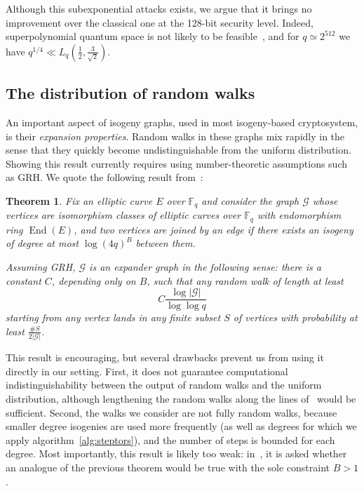 \documentclass{article}
\newcommand{\F}{\mathbb{F}}
\newcommand{\Graph}{\mathcal{G}}
\newtheorem{theorem}{Theorem}[section]
\theoremstyle{definition}
\DeclareMathOperator{\End}{End}
\begin{document}
Although this subexponential attacks exists, we argue that
it brings no improvement over the classical one at the
128-bit security level. Indeed, superpolynomial quantum space
is not likely to be feasible~\cite{todo:qubits}, and for $q\simeq 2^{512}$
we have $q^{1/4} \ll L_q(\frac{1}{2}, \frac{3}{\sqrt{2}}).$

\subsection{The distribution of random walks}

An important aspect of isogeny graphs, used in most
isogeny-based cryptosystem, is their \emph{expansion properties}.
Random walks in these graphs mix rapidly in the sense that they
quickly become undistinguishable from the uniform distribution.
Showing this result currently requires using number-theoretic
assumptions such as GRH.
We quote the following result from~\cite{jao+miller+venkatesan09}:

\begin{theorem}
Fix an elliptic curve $E$ over $\F_q$ and consider the graph $\Graph$
whose vertices are isomorphism classes of elliptic curves over $\F_q$
with endomorphism ring $\End(E)$, and two vertices are joined by an edge
if there exists an isogeny of degree at most $\log(4q)^B$ between them.

Assuming GRH, $\Graph$ is an expander graph in the following sense:
there is a constant $C$, depending only on $B$, such that any random
walk of length at least
\[
	C \frac{\log |\Graph|}{\log\log q}
\]
starting from any vertex lands in any finite subset $S$ of vertices
with probability at least $\frac{\#S}{2|\Graph|}$.
\end{theorem}

This result is encouraging, but several drawbacks prevent us from
using it directly in our setting. First, it does not guarantee
computational indistinguishability between the output of random
walks and the uniform distribution, although lengthening the
random walks along the lines of~\cite[Theorem ...]{todo:expanders}
would be sufficient. Second, the walks we consider are not fully random
walks, because smaller degree isogenies are used more frequently
(as well as degrees for which we apply algorithm~\ref{alg:steptors}),
and the number of steps is bounded for each degree. Most
importantly, this result is likely too weak: in~\cite[7.2]{jao+miller+venkatesan09},
it is asked whether an analogue of the previous theorem would
be true with the sole constraint $B>1$.
\end{document}
